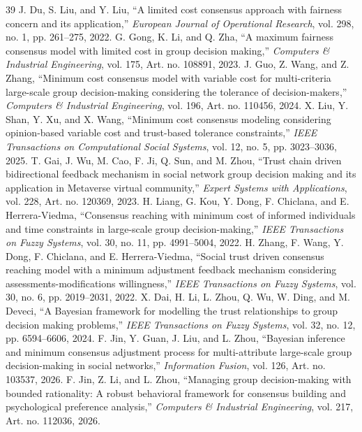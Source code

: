 \documentclass[journal]{IEEEtran}
\begin{document}
\begin{thebibliography}{39}
 J. Du, S. Liu, and Y. Liu, ``A limited cost consensus approach with fairness concern and its application,'' \emph{European Journal of Operational Research}, vol. 298, no. 1, pp. 261--275, 2022.
 G. Gong, K. Li, and Q. Zha, ``A maximum fairness consensus model with limited cost in group decision making,'' \emph{Computers \& Industrial Engineering}, vol. 175, Art. no. 108891, 2023.
 J. Guo, Z. Wang, and Z. Zhang, ``Minimum cost consensus model with variable cost for multi-criteria large-scale group decision-making considering the tolerance of decision-makers,'' \emph{Computers \& Industrial Engineering}, vol. 196, Art. no. 110456, 2024.
 X. Liu, Y. Shan, Y. Xu, and X. Wang, ``Minimum cost consensus modeling considering opinion-based variable cost and trust-based tolerance constraints,'' \emph{IEEE Transactions on Computational Social Systems}, vol. 12, no. 5, pp. 3023--3036, 2025.
 T. Gai, J. Wu, M. Cao, F. Ji, Q. Sun, and M. Zhou, ``Trust chain driven bidirectional feedback mechanism in social network group decision making and its application in Metaverse virtual community,'' \emph{Expert Systems with Applications}, vol. 228, Art. no. 120369, 2023.
 H. Liang, G. Kou, Y. Dong, F. Chiclana, and E. Herrera-Viedma, ``Consensus reaching with minimum cost of informed individuals and time constraints in large-scale group decision-making,'' \emph{IEEE Transactions on Fuzzy Systems}, vol. 30, no. 11, pp. 4991--5004, 2022.
 H. Zhang, F. Wang, Y. Dong, F. Chiclana, and E. Herrera-Viedma, ``Social trust driven consensus reaching model with a minimum adjustment feedback mechanism considering assessments-modifications willingness,'' \emph{IEEE Transactions on Fuzzy Systems}, vol. 30, no. 6, pp. 2019--2031, 2022.
 X. Dai, H. Li, L. Zhou, Q. Wu, W. Ding, and M. Deveci, ``A Bayesian framework for modelling the trust relationships to group decision making problems,'' \emph{IEEE Transactions on Fuzzy Systems}, vol. 32, no. 12, pp. 6594--6606, 2024.
 F. Jin, Y. Guan, J. Liu, and L. Zhou, ``Bayesian inference and minimum consensus adjustment process for multi-attribute large-scale group decision-making in social networks,'' \emph{Information Fusion}, vol. 126, Art. no. 103537, 2026.
 F. Jin, Z. Li, and L. Zhou, ``Managing group decision-making with bounded rationality: A robust behavioral framework for consensus building and psychological preference analysis,'' \emph{Computers \& Industrial Engineering}, vol. 217, Art. no. 112036, 2026.

\end{thebibliography}
\end{document}
